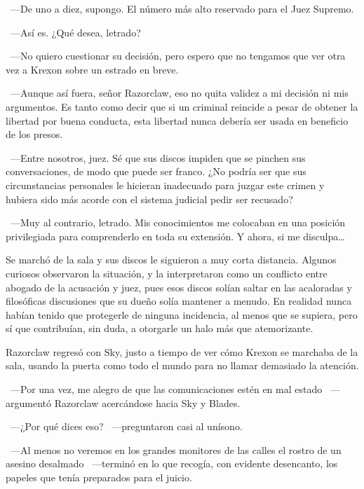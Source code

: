 ~---De uno a diez, supongo. El número más alto reservado para el Juez Supremo.

~---Así es. ¿Qué desea, letrado?

~---No quiero cuestionar su decisión, pero espero que no tengamos que ver otra vez a Krexon sobre un estrado en breve.

~---Aunque así fuera, señor Razorclaw, eso no quita validez a mi decisión ni mis argumentos. Es tanto como decir que si un criminal reincide a pesar de obtener la libertad por buena conducta, esta libertad nunca debería ser usada en beneficio de los presos.

~---Entre nosotros, juez. Sé que sus discos impiden que se pinchen sus conversaciones, de modo que puede ser franco. ¿No podría ser que sus circunstancias personales le hicieran inadecuado para juzgar este crimen y hubiera sido más acorde con el sistema judicial pedir ser recusado?

~---Muy al contrario, letrado. Mis conocimientos me colocaban en una posición privilegiada para comprenderlo en toda su extensión. Y ahora, si me disculpa\dots\

Se marchó de la sala y sus discos le siguieron a muy corta distancia. Algunos curiosos observaron la situación, y la interpretaron como un conflicto entre abogado de la acusación y juez, pues esos discos solían saltar en las acaloradas y filosóficas discusiones que su dueño solía mantener a menudo. En realidad nunca habían tenido que protegerle de ninguna incidencia, al menos que se supiera, pero sí que contribuían, sin duda, a otorgarle un halo más que atemorizante.

Razorclaw regresó con Sky, justo a tiempo de ver cómo Krexon se marchaba de la sala, usando la puerta como todo el mundo para no llamar demasiado la atención.

~---Por una vez, me alegro de que las comunicaciones estén en mal estado ~---argumentó Razorclaw acercándose hacia Sky y Blades.

~---¿Por qué dices eso? ~---preguntaron casi al unísono.

~---Al menos no veremos en los grandes monitores de las calles el rostro de un asesino desalmado ~---terminó en lo que recogía, con evidente desencanto, los papeles que tenía preparados para el juicio.
